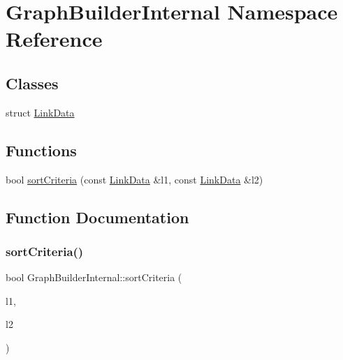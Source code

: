 \hypertarget{namespace_graph_builder_internal}{}\section{Graph\+Builder\+Internal Namespace Reference}
\label{namespace_graph_builder_internal}
\subsection*{Classes}
\begin{DoxyCompactItemize}
\item 
struct \mbox{\hyperlink{struct_graph_builder_internal_1_1_link_data}{Link\+Data}}
\end{DoxyCompactItemize}
\subsection*{Functions}
\begin{DoxyCompactItemize}
\item 
bool \mbox{\hyperlink{namespace_graph_builder_internal_a78cfb19694d3614f447f91ecf0ada473}{sort\+Criteria}} (const \mbox{\hyperlink{struct_graph_builder_internal_1_1_link_data}{Link\+Data}} \&l1, const \mbox{\hyperlink{struct_graph_builder_internal_1_1_link_data}{Link\+Data}} \&l2)
\end{DoxyCompactItemize}


\subsection{Function Documentation}
\mbox{\label{namespace_graph_builder_internal_a78cfb19694d3614f447f91ecf0ada473}} 
\subsubsection{\texorpdfstring{sortCriteria()}{sortCriteria()}}
{\footnotesize\ttfamily bool Graph\+Builder\+Internal\+::sort\+Criteria (\begin{DoxyParamCaption}\item[{const \mbox{\hyperlink{struct_graph_builder_internal_1_1_link_data}{Link\+Data}} \&}]{l1,  }\item[{const \mbox{\hyperlink{struct_graph_builder_internal_1_1_link_data}{Link\+Data}} \&}]{l2 }\end{DoxyParamCaption})}

